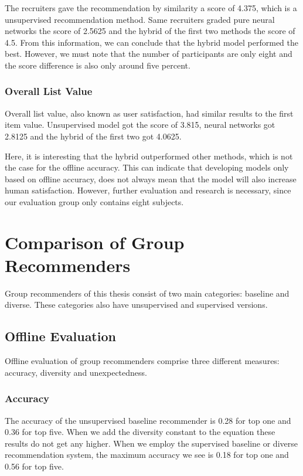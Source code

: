The recruiters gave the recommendation by similarity a score of 4.375, which is a unsupervised recommendation method. Same recruiters graded pure neural networks the score of 2.5625 and the hybrid of the first two methods the score of 4.5. From this information, we can conclude that the hybrid model performed the best. However, we must note that the number of participants are only eight and the score difference is also only around five percent.

\subsubsection{Overall List Value}

Overall list value, also known as user satisfaction, had similar results to the first item value. Unsupervised model got the score of 3.815, neural networks got 2.8125 and the hybrid of the first two got 4.0625.

Here, it is interesting that the hybrid outperformed other methods, which is not the case for the offline accuracy. This can indicate that developing models only based on offline accuracy, does not always mean that the model will also increase human satisfaction. However, further evaluation and research is necessary, since our evaluation group only contains eight subjects.

\section{Comparison of Group Recommenders}

Group recommenders of this thesis consist of two main categories: baseline and diverse. These categories also have unsupervised and supervised versions.

\subsection{Offline Evaluation}

Offline evaluation of group recommenders comprise three different measures: accuracy, diversity and unexpectedness.

\subsubsection{Accuracy}

The accuracy of the unsupervised baseline recommender is 0.28 for top one and 0.36 for top five. When we add the diversity constant to the equation these results do not get any higher. When we employ the supervised baseline or diverse recommendation system, the maximum accuracy we see is 0.18 for top one and 0.56 for top five.


